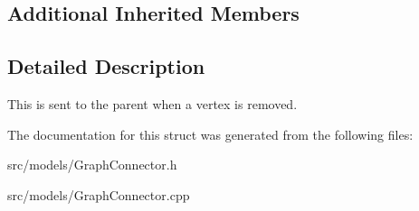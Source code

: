 \subsection*{Additional Inherited Members}


\subsection{Detailed Description}
This is sent to the parent when a vertex is removed. 

The documentation for this struct was generated from the following files\+:\begin{DoxyCompactItemize}
\item 
src/models/Graph\+Connector.\+h\item 
src/models/Graph\+Connector.\+cpp\end{DoxyCompactItemize}
